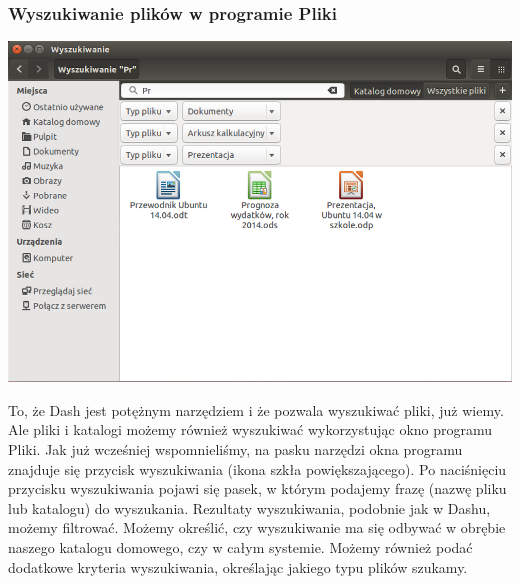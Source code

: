 \subsubsection{Wyszukiwanie plików w programie Pliki}
\begin{center}
	\includegraphics[width=\linewidth]{images/programy_nautilus2.png}
\end{center}

To, że Dash jest potężnym narzędziem i że pozwala wyszukiwać pliki, już wiemy. Ale pliki i katalogi możemy również wyszukiwać wykorzystując okno programu Pliki. Jak już wcześniej wspomnieliśmy, na pasku narzędzi okna programu znajduje się przycisk wyszukiwania (ikona szkła powiększającego). Po naciśnięciu przycisku wyszukiwania pojawi się pasek, w którym podajemy frazę (nazwę pliku lub katalogu) do wyszukania. Rezultaty wyszukiwania, podobnie jak w Dashu, możemy filtrować. Możemy określić, czy wyszukiwanie ma się odbywać w obrębie naszego katalogu domowego, czy w całym systemie. Możemy również podać dodatkowe kryteria wyszukiwania, określając jakiego typu plików szukamy.

